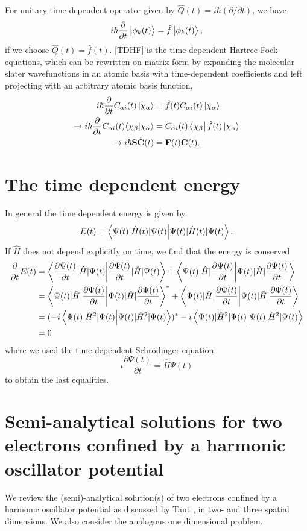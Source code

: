\documentclass[aip,jcp,reprint,floatfix]{revtex4-1}
\begin{document}
\begin{appendices}
For unitary time-dependent operator given by $\hat{Q}(t) = i\hbar (\partial / \partial t)$,
we have
\begin{equation}
    \label{TDHF}
    i \hbar \frac{\partial}{\partial t} \ket{\phi_k(t)} = \hat{f} \ket{\phi_k(t)},
\end{equation}
if we choose $\hat{Q}(t) = \hat{f}(t)$. \autoref{TDHF} is the time-dependent Hartree-Fock equations, which can be rewritten on matrix form by expanding the molecular slater wavefunctions in an atomic basis with time-dependent coefficients and left projecting with an arbitrary atomic basis function,
\begin{align}
    i \hbar \frac{\partial}{\partial t} C_{\alpha i} (t) \ket{\chi_\alpha} &= \hat{f}(t) C_{\alpha i} (t) \ket{\chi_\alpha} \\
    \to i \hbar \frac{\partial}{\partial t} C_{\alpha i} (t) \langle{\chi_{\beta}}|{\chi_{\alpha}}\rangle &= C_{\alpha i}(t) \bra{\chi_\beta} \hat{f}(t) \ket{\chi_\alpha} \\
    \to i \hbar \mathbf{S}\dot{\mathbf{C}}(t) &= \mathbf{F}(t) \mathbf{C}(t).
\end{align}
\section{The time dependent energy}
In general the time dependent energy is given by 
\begin{equation}
    E(t) = \braket{\Psi(t)|\hat{H}(t)|\Psi(t)}.
\end{equation}
If $\hat{H}$ does not depend explicitly on time, we find that the energy is conserved
\begin{align*}
     \frac{\partial}{\partial t}E(t) &= \braket{\frac{\partial \Psi(t)}{\partial t}|\hat{H}|\Psi(t)} + \braket{\Psi(t)|\hat{H}|\frac{\partial \Psi(t)}{\partial t}} \\
     &= \braket{\Psi(t)|\hat{H}|\frac{\partial \Psi(t)}{\partial t}}^* + \braket{\Psi(t)|\hat{H}|\frac{\partial \Psi(t)}{\partial t}} \\
     &= (-i\braket{\Psi(t)|\hat{H}^2|\Psi(t)})^* -i\braket{\Psi(t)|\hat{H}^2|\Psi(t)} \\
     &= 0
\end{align*}
where we used the time dependent Schrödinger equation 
\begin{equation}
    i \frac{\partial \Psi(t)}{\partial t}  = \hat{H} \Psi(t)
\end{equation}
to obtain the last equalities.
\section{Semi-analytical solutions for two electrons confined by a harmonic oscillator potential}
We review the (semi)-analytical solution(s) of two electrons confined by a harmonic oscillator potential as discussed by Taut \cite{Taut93,Taut94}, in two- and three spatial dimensions. We also consider the analogous one dimensional problem. 


\end{appendices}
\end{document}
